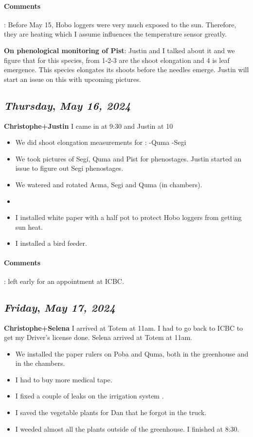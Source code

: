 \paragraph{Comments}:
Before May 15, Hobo loggers were very much exposed to the sun. Therefore, they are heating which I assume influences the temperature sensor greatly. 

\textbf{On phenological monitoring of Pist}: Justin and I talked about it and we figure that for this species, from 1-2-3 are the shoot elongation and 4 is leaf emergence. This species elongates its shoots before the needles emerge. Justin will start an issue on this with upcoming pictures. 

\def\day{\textit{May 16, 2024}}
\def\weekday{\textit{Thursday}}
\subsection*{\weekday, \day}
\textbf{Christophe+Justin}
I came in at 9:30 and Justin at 10
\begin{itemize}
    \item We did shoot elongation measurements for : -Quma  -Segi
    \item We took pictures of Segi, Quma and Pist for phenostages. Justin started an issue to figure out Segi phenostages.
    \item We watered and rotated Acma, Segi and Quma (in chambers).
    \item 
    \item I installed white paper with a half pot to protect Hobo loggers from getting sun heat.
    \item I installed a bird feeder.
\end{itemize}
\paragraph{Comments}
: left early for an appointment at ICBC.
\def\day{\textit{May 17, 2024}}
\def\weekday{\textit{Friday}}
\subsection*{\weekday, \day}
\textbf{Christophe+Selena} 
I arrived at Totem at 11am. I had to go back to ICBC to get my Driver's license done. Selena arrived at Totem at 11am. 
\begin{itemize}
    \item We installed the paper rulers on Poba and Quma, both in the greenhouse and in the chambers.
    \item I had to buy more medical tape.
    \item I fixed a couple of leaks on the irrigation system .
    \item I saved the vegetable plants for Dan that he forgot in the truck.
    \item I weeded almost all the plants outside of the greenhouse. I finished at 8:30.
\end{itemize}
\def\day{\textit{May 20, 2024}}
\def\weekday{\textit{Friday}}
